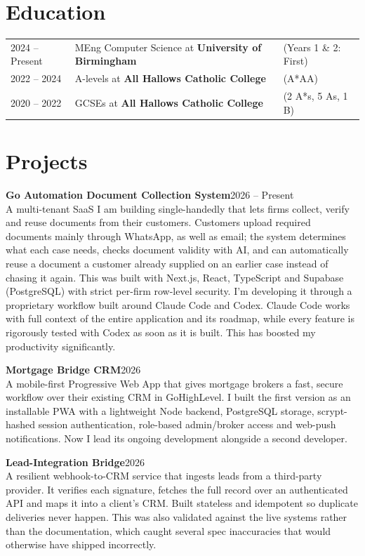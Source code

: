 \documentclass[11pt,a4paper]{article}
\newcommand{\project}[2]{\noindent\textbf{#1}\hfill #2}
\begin{document}
\section*{Education}
\begin{tabular}{@{}p{2.5cm} p{9.2cm} >{\raggedleft\arraybackslash}p{4.2cm}@{}}
  2024 -- Present & MEng Computer Science at \textbf{University of Birmingham} & (Years 1 \& 2: First) \\
  2022 -- 2024 & A-levels at \textbf{All Hallows Catholic College} & (A*AA) \\
  2020 -- 2022 & GCSEs at \textbf{All Hallows Catholic College} & (2 A*s, 5 As, 1 B) \\
\end{tabular}

\section*{Projects}
\project{Go Automation Document Collection System}{2026 -- Present}\\
A multi-tenant SaaS I am building single-handedly that lets firms collect, verify and reuse documents from their customers. Customers upload required documents mainly through WhatsApp, as well as email; the system determines what each case needs, checks document validity with AI, and can automatically reuse a document a customer already supplied on an earlier case instead of chasing it again. This was built with Next.js, React, TypeScript and Supabase (PostgreSQL) with strict per-firm row-level security. I'm developing it through a proprietary workflow built around Claude Code and Codex. Claude Code works with full context of the entire application and its roadmap, while every feature is rigorously tested with Codex as soon as it is built. This has boosted my productivity significantly.

\vspace{6pt}
\project{Mortgage Bridge CRM}{2026}\\
A mobile-first Progressive Web App that gives mortgage brokers a fast, secure workflow over their existing CRM in GoHighLevel. I built the first version as an installable PWA with a lightweight Node backend, PostgreSQL storage, scrypt-hashed session authentication, role-based admin/broker access and web-push notifications. Now I lead its ongoing development alongside a second developer.

\vspace{6pt}
\project{Lead-Integration Bridge}{2026}\\
A resilient webhook-to-CRM service that ingests leads from a third-party provider. It verifies each signature, fetches the full record over an authenticated API and maps it into a client's CRM. Built stateless and idempotent so duplicate deliveries never happen. This was also validated against the live systems rather than the documentation, which caught several spec inaccuracies that would otherwise have shipped incorrectly.
\end{document}
